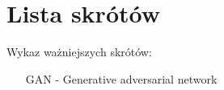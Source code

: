 \chapter{Lista skrótów}
\newline
Wykaz ważniejszych skrótów:

\begin{itemize}
  \item[GAN] - Generative adversarial network
\end{itemize}
